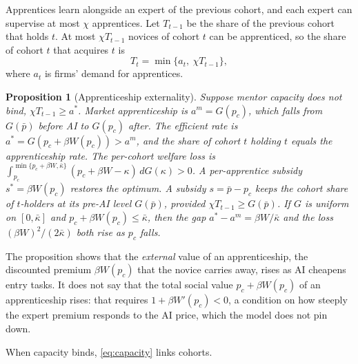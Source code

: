 \documentclass[12pt]{article}
\newtheorem{proposition}{Proposition}
\theoremstyle{remark}
\begin{document}
Apprentices learn alongside an expert of the previous cohort, and each expert can supervise at most $\chi$ apprentices. Let $T_{t-1}$ be the share of the previous cohort that holds $t$. At most $\chi T_{t-1}$ novices of cohort $t$ can be apprenticed, so the share of cohort $t$ that acquires $t$ is
\begin{equation}\label{eq:capacity}
T_t=\min\{a_t,\ \chi T_{t-1}\},
\end{equation}
where $a_t$ is firms' demand for apprentices.

\begin{proposition}[Apprenticeship externality]\label{prop:apprentice}
Suppose mentor capacity does not bind, $\chi T_{t-1}\ge a^*$. Market apprenticeship is $a^m=G(p_c)$, which falls from $G(\bar p)$ before AI to $G(p_c)$ after. The efficient rate is $a^*=G(p_c+\beta W(p_c))>a^m$, and the share of cohort $t$ holding $t$ equals the apprenticeship rate. The per-cohort welfare loss is $\int_{p_c}^{\min\{p_c+\beta W,\bar\kappa\}}(p_c+\beta W-\kappa)\,dG(\kappa)>0$. A per-apprentice subsidy $s^*=\beta W(p_c)$ restores the optimum. A subsidy $s=\bar p-p_c$ keeps the cohort share of $t$-holders at its pre-AI level $G(\bar p)$, provided $\chi T_{t-1}\ge G(\bar p)$. If $G$ is uniform on $[0,\bar\kappa]$ and $p_c+\beta W(p_c)\le\bar\kappa$, then the gap $a^*-a^m=\beta W/\bar\kappa$ and the loss $(\beta W)^2/(2\bar\kappa)$ both rise as $p_c$ falls.
\end{proposition}

The proposition shows that the \emph{external} value of an apprenticeship, the discounted premium $\beta W(p_c)$ that the novice carries away, rises as AI cheapens entry tasks. It does not say that the total social value $p_c+\beta W(p_c)$ of an apprenticeship rises: that requires $1+\beta W'(p_c)<0$, a condition on how steeply the expert premium responds to the AI price, which the model does not pin down.

When capacity binds, \eqref{eq:capacity} links cohorts.
\end{document}
